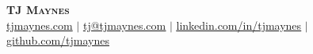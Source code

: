 \begin{center}
  \textbf{\Huge \scshape TJ Maynes} \\ \vspace{1pt}
  \href{https://tjmaynes.com}{tjmaynes.com} $|$
  \href{mailto:tj@tjmaynes.com}{\underline{tj@tjmaynes.com}} $|$
  \href{https://linkedin.com/in/tjmaynes}{\underline{linkedin.com/in/tjmaynes}} $|$
  \href{https://github.com/tjmaynes}{\underline{github.com/tjmaynes}}
\end{center}
